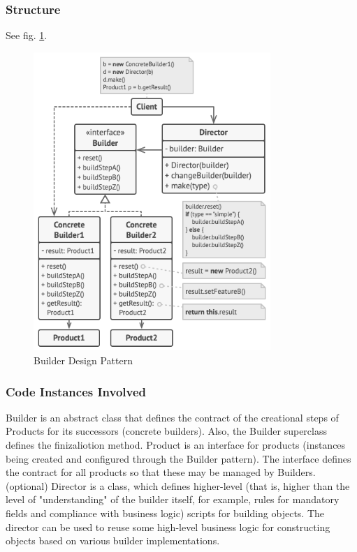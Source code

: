 \documentclass[sigplan,12pt,nonacm=true,review=false]{acmart}
\begin{document}
\subsubsection{Structure}
See fig. \ref{fig:01}.
\begin{figure}[!t]
  \includegraphics[width=0.8\textwidth]{eolang/tr-02/assets/Picture01.png}
  \caption{Builder Design Pattern}
  \label{fig:01}
\end{figure}

\subsubsection{Code Instances Involved}
Builder is an abstract class that defines the contract of the creational steps of Products for its successors (concrete builders). Also, the Builder superclass defines the finizaliotion method. 
Product is an interface for products (instances being created and configured through the Builder pattern). The interface defines the contract for all products so that these may be managed by Builders.
(optional) Director is a class, which defines higher-level (that is, higher than the level of "understanding" of the builder itself, for example, rules for mandatory fields and compliance with business logic) scripts for building objects. The director can be used to reuse some high-level business logic for constructing objects based on various builder implementations.
\end{document}
